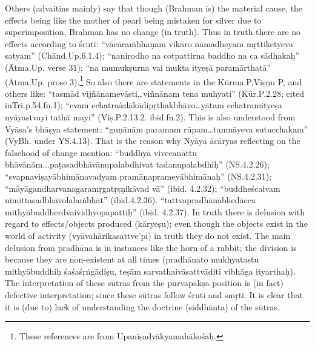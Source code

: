 Others (advaitins mainly) say that though (Brahman is) the material cause, the effects being like the mother of pearl being mistaken for silver due to superimposition, Brahman has no change (in truth). Thus in truth there are no effects according to śruti: “vācāraṁbhaṇam vikāro nāmadheyam mṛttiketyeva satyam” (Chānd.Up.6.1.4); “nanirodho na cotpattirna baddho na ca sādhakaḥ” (Ātma.Up. verse 31); “na mumukṣurna vai mukta ityeṣā paramārthatā” (Ātma.Up. prose 3).\footnote{These references are from Upaniṣadvākyamahākośaḥ.} So also there are statements in the  Kūrma.P,Viṣṇu P, and others like: “tasmād vijñānamevāsti…viñnānam tena muhyati” (Kūr.P.2.28; cited in\break Tri.p.54.fn.1);  “evam cchatraśalākādipṛthakbhāvo…yātam cchatramityeṣa nyāyastvayi tathā mayi” (Viṣ.P.2.13.2. ibid.fn.2). This is also understood from Vyāsa’s bhāṣya statement: “guṇānām paramam rūpam\-…tanmāyeva sutucchakam” (VyBh. under YS.4.13). That is the reason why Nyāya ācāryas reflecting on the falsehood of change mention: “buddhyā vivecanāttu bhāvānām...paṭasadbhāvānupalabdhivat tadanupalabdhiḥ” (NS.4.2.26); “svapnaviṣayābhimānavadyam pramā\-ṇaprameyābhimānaḥ” (NS.4.2.31); “māyāgandharvanagaramṛgatṛṣṇi\-kāvad vā” (ibid. 4.2.32); “buddheścaivam nimittasadbhāvolalaṁbhāt” (ibid.4.2.36). ``tattvapradhānabhedācca mithyābuddherdvaividhyopapattiḥ'' (ibid. 4.2.37). In truth there is delusion with regard to effects/objects produced (kāryeṣu); even though the objects exist in the world of activity (vyāvahārikasattve’pi) in truth they do not exist. The main delusion from pradhāna is in instances like the horn of a rabbit; the division is because they are non-existent at all times (pradhānato mukhyatastu mithyābuddhiḥ śaśaśṛṅgādiṣu, teṣām sarvathaivāsattvā\-diti vibhāga ityarthaḥ). The interpretation of these sūtras from the pūrvapakṣa position is (in fact) defective interpretation;  since these sūtras follow śruti and smṛti. It is clear that it is (due to) lack of understanding the doctrine (siddhānta) of the sūtras.

